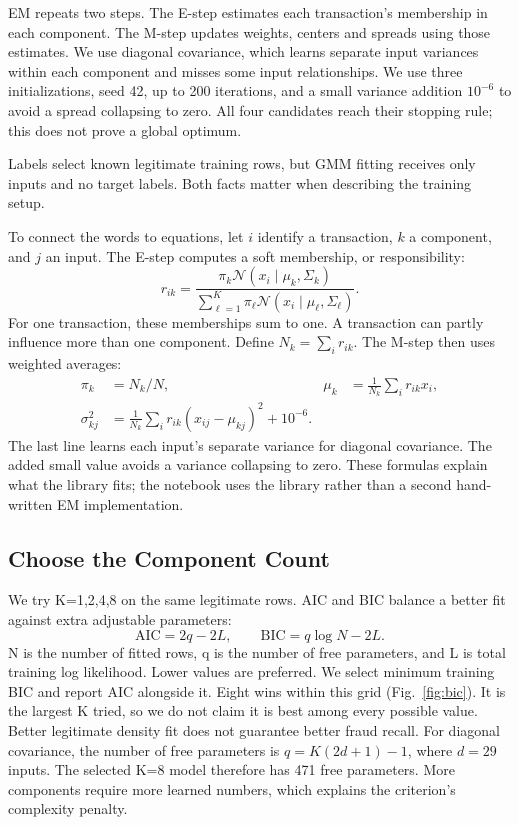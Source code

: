 \documentclass[conference]{IEEEtran}
\begin{document}
EM repeats two steps. The E-step estimates each transaction's membership in each component. The M-step updates weights, centers and spreads using those estimates. We use diagonal covariance, which learns separate input variances within each component and misses some input relationships. We use three initializations, seed 42, up to 200 iterations, and a small variance addition $10^{-6}$ to avoid a spread collapsing to zero. All four candidates reach their stopping rule; this does not prove a global optimum.

Labels select known legitimate training rows, but GMM fitting receives only inputs and no target labels. Both facts matter when describing the training setup.

To connect the words to equations, let $i$ identify a transaction, $k$ a component, and $j$ an input. The E-step computes a soft membership, or responsibility:
\begin{equation}
r_{ik}=\frac{\pi_k\mathcal{N}(x_i\mid\mu_k,\Sigma_k)}{\sum_{\ell=1}^{K}\pi_\ell\mathcal{N}(x_i\mid\mu_\ell,\Sigma_\ell)}.
\end{equation}
For one transaction, these memberships sum to one. A transaction can partly influence more than one component. Define $N_k=\sum_i r_{ik}$. The M-step then uses weighted averages:
\begin{align}
\pi_k&=N_k/N, & \mu_k&=\frac{1}{N_k}\sum_i r_{ik}x_i,\\
\sigma_{kj}^2&=\frac{1}{N_k}\sum_i r_{ik}(x_{ij}-\mu_{kj})^2+10^{-6}.
\end{align}
The last line learns each input's separate variance for diagonal covariance. The added small value avoids a variance collapsing to zero. These formulas explain what the library fits; the notebook uses the library rather than a second hand-written EM implementation.


\subsection{Choose the Component Count}
We try K=1,2,4,8 on the same legitimate rows. AIC and BIC balance a better fit against extra adjustable parameters:
\begin{equation}
\mathrm{AIC}=2q-2L,\qquad \mathrm{BIC}=q\log N-2L.
\end{equation}
N is the number of fitted rows, q is the number of free parameters, and L is total training log likelihood. Lower values are preferred. We select minimum training BIC and report AIC alongside it. Eight wins within this grid (Fig.~\ref{fig:bic}). It is the largest K tried, so we do not claim it is best among every possible value. Better legitimate density fit does not guarantee better fraud recall. For diagonal covariance, the number of free parameters is $q=K(2d+1)-1$, where $d=29$ inputs. The selected K=8 model therefore has 471 free parameters. More components require more learned numbers, which explains the criterion's complexity penalty.
\end{document}
